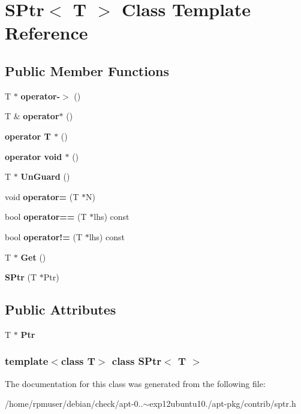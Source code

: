 \section{\-S\-Ptr$<$ \-T $>$ \-Class \-Template \-Reference}
\label{classSPtr}
\subsection*{\-Public \-Member \-Functions}
\begin{DoxyCompactItemize}
\item 
\-T $\ast$ {\bfseries operator-\/$>$} ()\label{classSPtr_af6e485beee07fd401de29c8cdf898c69}

\item 
\-T \& {\bfseries operator$\ast$} ()\label{classSPtr_af7f8c6b921dca2b94f6e7ee14e762770}

\item 
{\bfseries operator T $\ast$} ()\label{classSPtr_a4e20322854ce5d78776cdaf1a87aacd9}

\item 
{\bfseries operator void $\ast$} ()\label{classSPtr_a0b32021b12206ef34495c688760c44bf}

\item 
\-T $\ast$ {\bfseries \-Un\-Guard} ()\label{classSPtr_a138f89ea209d517d530b808e524125e1}

\item 
void {\bfseries operator=} (\-T $\ast$\-N)\label{classSPtr_a4f37889697348747d7432d0e8368a7fd}

\item 
bool {\bfseries operator==} (\-T $\ast$lhs) const \label{classSPtr_a8039659521ab9ef2bb9ab69befd8792a}

\item 
bool {\bfseries operator!=} (\-T $\ast$lhs) const \label{classSPtr_ad28d3ead733e4eb4aa84e9e1e686fd8d}

\item 
\-T $\ast$ {\bfseries \-Get} ()\label{classSPtr_a9381b54160045cd20c4246fc8d23da10}

\item 
{\bfseries \-S\-Ptr} (\-T $\ast$\-Ptr)\label{classSPtr_ae25b5a3a226199c04f79452e31ad047d}

\end{DoxyCompactItemize}
\subsection*{\-Public \-Attributes}
\begin{DoxyCompactItemize}
\item 
\-T $\ast$ {\bfseries \-Ptr}\label{classSPtr_a89d6013a0fce85f8d86599a3d328aac0}

\end{DoxyCompactItemize}
\subsubsection*{template$<$class \-T$>$ class S\-Ptr$<$ T $>$}



\-The documentation for this class was generated from the following file\-:\begin{DoxyCompactItemize}
\item 
/home/rpmuser/debian/check/apt-\/0..$\sim$exp12ubuntu10./apt-\/pkg/contrib/sptr.\-h\end{DoxyCompactItemize}
